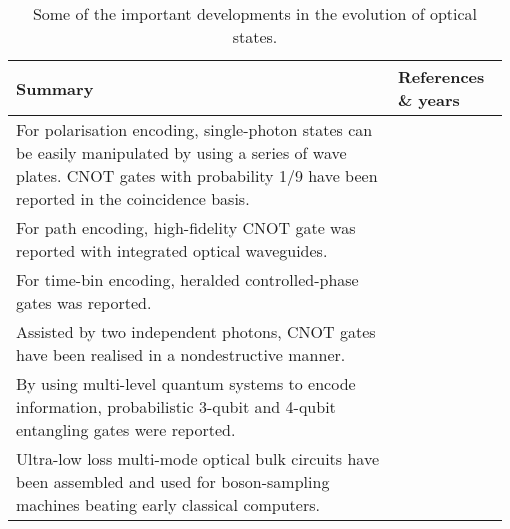 \begin{table*}[!htbp]
	\begin{tabular}{|p{0.755\linewidth}|p{0.22\linewidth}|}
		\hline \hline
		Summary & References \& years \\
		\hline \hline
		For polarisation encoding, single-photon states can be easily manipulated by using a series of wave plates. CNOT gates with probability 1/9 have been reported in the coincidence basis. &  \cite{bib:Brien2003demonstration, bib:Kiesel2005, bib:Langford2005,  bib:Okamoto2005} \\
		\hline
		For path encoding, high-fidelity CNOT gate was reported with integrated optical waveguides. & \cite{bib:politi2008silica} \\
		\hline
		For time-bin encoding, heralded controlled-phase gates was reported. & \cite{bib:Humphreys2013} \\
		\hline
		Assisted by two independent photons, CNOT gates have been realised in a nondestructive manner. & \cite{bib:Bao2007Optical, bib:Zhao2005Experimental} \\
		\hline
		By using multi-level quantum systems to encode information, probabilistic 3-qubit and 4-qubit entangling gates were reported. & \cite{bib:lanyon2009simplifying, bib:starek2016} \\
		\hline
		Ultra-low loss multi-mode optical bulk circuits have been assembled and used for boson-sampling machines beating early classical computers. & \cite{bib:wang2017high, bib:wang2018toward} \\
		\hline
	\end{tabular}
	\captionspacetab \caption{Some of the important developments in the evolution of optical states.} \label{tab:evolutionofstates}
\end{table*}

